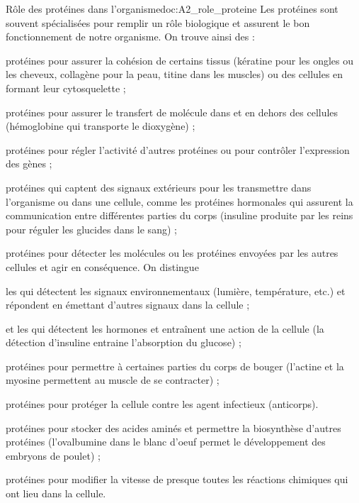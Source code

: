 \begin{doc}{Rôle des protéines dans l'organisme}{doc:A2_role_proteine}
  Les protéines sont souvent spécialisées pour remplir un rôle biologique et assurent le bon fonctionnement de notre organisme.
  On trouve ainsi des :
  \begin{listePoints}
    \item protéines  pour assurer la cohésion de certains tissus (kératine pour les ongles ou les cheveux, collagène pour la peau, titine dans les muscles) ou des cellules en formant leur cytosquelette ;
    \item protéines  pour assurer le transfert de molécule dans et en dehors des cellules (hémoglobine qui transporte le dioxygène) ;
    \item protéines  pour régler l'activité d'autres protéines ou pour contrôler l'expression des gènes ;
    \item protéines  qui captent des signaux extérieurs pour les transmettre dans l'organisme ou dans une cellule, comme les protéines hormonales qui assurent la communication entre différentes parties du corps (insuline produite par les reins pour réguler les glucides dans le sang) ;
    \item protéines  pour détecter les molécules ou les protéines envoyées par les autres cellules et agir en conséquence. On distingue
    \begin{listePoints}
      \item les  qui détectent les signaux environnementaux (lumière, température, etc.) et répondent en émettant d'autres signaux dans la cellule ;
      \item et les  qui détectent les hormones et entraînent une action de la cellule (la détection d'insuline entraine l'absorption du glucose) ;
    \end{listePoints}
    \item protéines  pour permettre à certaines parties du corps de bouger (l'actine et la myosine permettent au muscle de se contracter) ;
    \item protéines  pour protéger la cellule contre les agent infectieux (anticorps).
    \item protéines  pour stocker des acides aminés et permettre la biosynthèse d'autres protéines (l'ovalbumine dans le blanc d'oeuf permet le développement des embryons de poulet) ;
    \item protéines  pour modifier la vitesse de presque toutes les réactions chimiques qui ont lieu dans la cellule.  
  \end{listePoints}
\end{doc}

